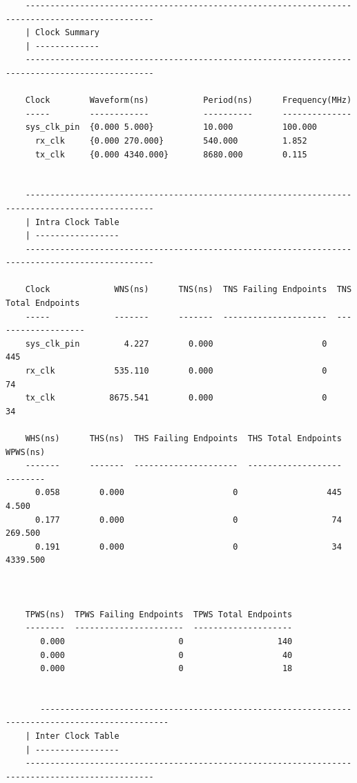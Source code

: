 \documentclass{report}
\begin{document}
\begin{verbatim}
    ------------------------------------------------------------------------------------------------
    | Clock Summary
    | -------------
    ------------------------------------------------------------------------------------------------
    
    Clock        Waveform(ns)           Period(ns)      Frequency(MHz)
    -----        ------------           ----------      --------------
    sys_clk_pin  {0.000 5.000}          10.000          100.000         
      rx_clk     {0.000 270.000}        540.000         1.852           
      tx_clk     {0.000 4340.000}       8680.000        0.115           
    
    
    ------------------------------------------------------------------------------------------------
    | Intra Clock Table
    | -----------------
    ------------------------------------------------------------------------------------------------
    
    Clock             WNS(ns)      TNS(ns)  TNS Failing Endpoints  TNS Total Endpoints
    -----             -------      -------  ---------------------  -------------------
    sys_clk_pin         4.227        0.000                      0                  445
    rx_clk            535.110        0.000                      0                   74
    tx_clk           8675.541        0.000                      0                   34
    
    WHS(ns)      THS(ns)  THS Failing Endpoints  THS Total Endpoints     WPWS(ns)
    -------      -------  ---------------------  -------------------     --------
      0.058        0.000                      0                  445        4.500
      0.177        0.000                      0                   74      269.500
      0.191        0.000                      0                   34     4339.500

    
    
    TPWS(ns)  TPWS Failing Endpoints  TPWS Total Endpoints  
    --------  ----------------------  --------------------  
       0.000                       0                   140  
       0.000                       0                    40
       0.000                       0                    18      
    
    
       ------------------------------------------------------------------------------------------------
    | Inter Clock Table
    | -----------------
    ------------------------------------------------------------------------------------------------
    

\end{verbatim}
\end{document}
